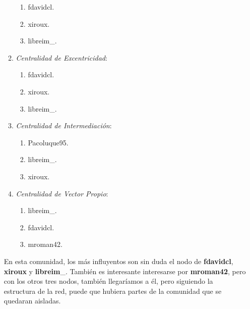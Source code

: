 \documentclass[paper=a4, fontsize=11pt]{article} %
\numberwithin{equation}{section} %
\numberwithin{figure}{section} %
\numberwithin{table}{section} %
\begin{document}
\begin{enumerate}[$\bullet$]
\begin{enumerate}[---]
    \begin{enumerate}
      \item fdavidcl.
      \item xiroux.
      \item libreim\_.
    \end{enumerate}
    \item \textit{Centralidad de Excentricidad}:
    \begin{enumerate}
      \item fdavidcl.
      \item xiroux.
      \item libreim\_.
    \end{enumerate}
    \item \textit{Centralidad de Intermediación}:
    \begin{enumerate}
      \item Pacoluque95.
      \item libreim\_.
      \item xiroux.
    \end{enumerate}
    \item \textit{Centralidad de Vector Propio}:
    \begin{enumerate}
      \item libreim\_.
      \item fdavidcl.
      \item mroman42.
    \end{enumerate}
  \end{enumerate}

  En esta comunidad, los más influyentos son sin duda el nodo de \textbf{fdavidcl}, \textbf{xiroux} y \textbf{libreim}\_. También es interesante interesarse por \textbf{mroman42}, pero con los otros tres nodos, también llegaríamos a él, pero siguiendo la estructura de la red, puede que hubiera partes de la comunidad que se quedaran aisladas.


\end{enumerate}
\end{document}
